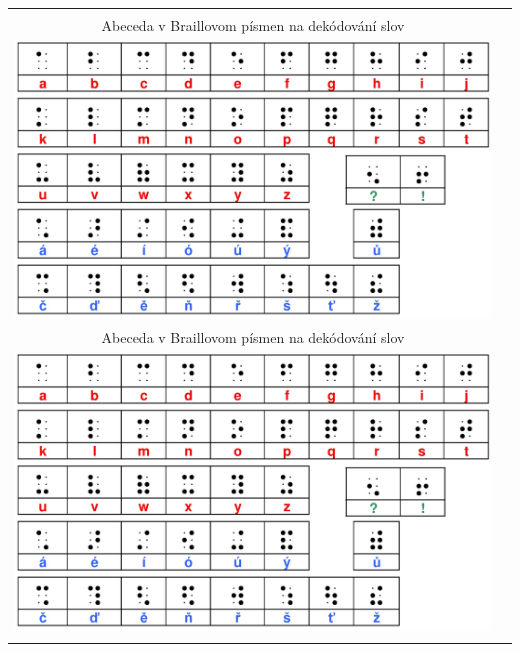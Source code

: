 \documentclass[10pt]{report}
\begin{document}
\begin{tabular}{c c}
\begin{minipage}{0.47\textwidth}
\begin{center}
\phantom{x}\\[10mm]
{\Large Abeceda v Braillovom písmen na dekódování slov}\\[1mm]
\includegraphics[width=\textwidth]{../images/brailleSkratene.png}
\end{center}
\end{minipage}
&
\begin{minipage}{0.47\textwidth}
\begin{center}
\phantom{x}\\[10mm]
{\Large Abeceda v Braillovom písmen na dekódování slov}\\[1mm]
\includegraphics[width=\textwidth]{../images/brailleSkratene.png}
\end{center}
\end{minipage}
\\
\begin{minipage}{0.47\textwidth}
\begin{center}

\end{center}
\end{minipage}
\end{tabular}
\end{document}
